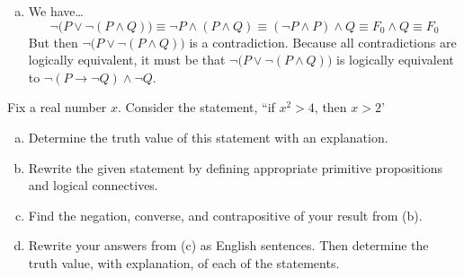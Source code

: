 \documentclass[11pt,letterpaper]{article}
\begin{document}
\begin{enumerate}[(a)]
\item We have\dots
	\[
	\neg \big(P \vee \neg (P \wedge Q) \big) \equiv \neg P \wedge (P \wedge Q) \equiv (\neg P \wedge P) \wedge Q \equiv F_0 \wedge Q \equiv F_0
	\]
But then $\neg \big(P \vee \neg (P \wedge Q) \big)$ is a contradiction. Because all contradictions are logically equivalent, it must be that $\neg \big(P \vee \neg (P \wedge Q) \big)$ is logically equivalent to $\neg (P \to \neg Q) \wedge \neg Q$.
\end{enumerate}



\newpage



 Fix a real number $x$. Consider the statement, ``if $x^2 > 4$, then $x > 2$'
	\begin{enumerate}[(a)]
	\item Determine the truth value of this statement with an explanation. 
	\item Rewrite the given statement by defining appropriate primitive propositions and logical connectives. 
	\item Find the negation, converse, and contrapositive of your result from (b).
	\item Rewrite your answers from (c) as English sentences. Then determine the truth value, with explanation, of each of the statements. 
	\end{enumerate} \pspace
\end{document}
